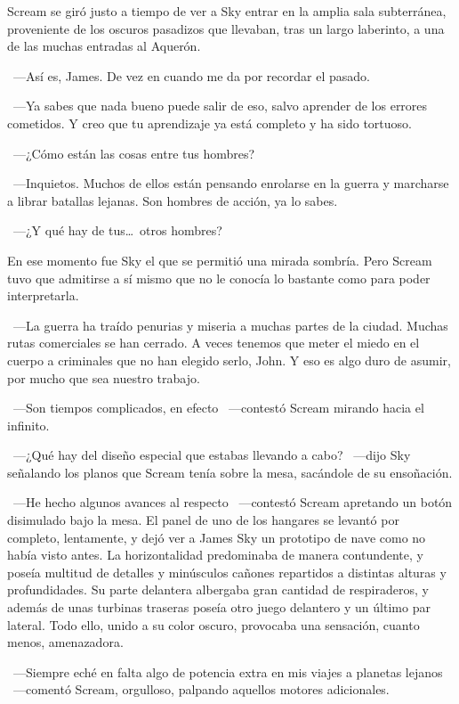 Scream se giró justo a tiempo de ver a Sky entrar en la amplia sala subterránea, proveniente de los oscuros pasadizos que llevaban, tras un largo laberinto, a una de las muchas entradas al Aquerón.

~---Así es, James. De vez en cuando me da por recordar el pasado.

~---Ya sabes que nada bueno puede salir de eso, salvo aprender de los errores cometidos. Y creo que tu aprendizaje ya está completo y ha sido tortuoso.

~---¿Cómo están las cosas entre tus hombres?

~---Inquietos. Muchos de ellos están pensando enrolarse en la guerra y marcharse a librar batallas lejanas. Son hombres de acción, ya lo sabes.

~---¿Y qué hay de tus\dots\ otros hombres?

En ese momento fue Sky el que se permitió una mirada sombría. Pero Scream tuvo que admitirse a sí mismo que no le conocía lo bastante como para poder interpretarla.

~---La guerra ha traído penurias y miseria a muchas partes de la ciudad. Muchas rutas comerciales se han cerrado. A veces tenemos que meter el miedo en el cuerpo a criminales que no han elegido serlo, John. Y eso es algo duro de asumir, por mucho que sea nuestro trabajo.

~---Son tiempos complicados, en efecto ~---contestó Scream mirando hacia el infinito.

~---¿Qué hay del diseño especial que estabas llevando a cabo? ~---dijo Sky señalando los planos que Scream tenía sobre la mesa, sacándole de su ensoñación.

~---He hecho algunos avances al respecto ~---contestó Scream apretando un botón disimulado bajo la mesa. El panel de uno de los hangares se levantó por completo, lentamente, y dejó ver a James Sky un prototipo de nave como no había visto antes. La horizontalidad predominaba de manera contundente, y poseía multitud de detalles y minúsculos cañones repartidos a distintas alturas y profundidades. Su parte delantera albergaba gran cantidad de respiraderos, y además de unas turbinas traseras poseía otro juego delantero y un último par lateral. Todo ello, unido a su color oscuro, provocaba una sensación, cuanto menos, amenazadora.

~---Siempre eché en falta algo de potencia extra en mis viajes a planetas lejanos ~---comentó Scream, orgulloso, palpando aquellos motores adicionales.

